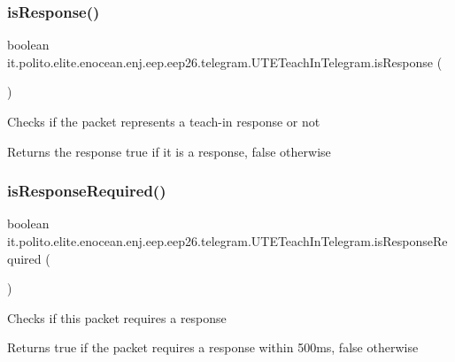 \subsubsection{\texorpdfstring{is\+Response()}{isResponse()}}
{\footnotesize\ttfamily boolean it.\+polito.\+elite.\+enocean.\+enj.\+eep.\+eep26.\+telegram.\+U\+T\+E\+Teach\+In\+Telegram.\+is\+Response (\begin{DoxyParamCaption}{ }\end{DoxyParamCaption})}

Checks if the packet represents a teach-\/in response or not

\begin{DoxyReturn}{Returns}
the response true if it is a response, false otherwise 
\end{DoxyReturn}
\hypertarget{classit_1_1polito_1_1elite_1_1enocean_1_1enj_1_1eep_1_1eep26_1_1telegram_1_1_u_t_e_teach_in_telegram_a868df93eade1fb217b158f589f205971}{}\label{classit_1_1polito_1_1elite_1_1enocean_1_1enj_1_1eep_1_1eep26_1_1telegram_1_1_u_t_e_teach_in_telegram_a868df93eade1fb217b158f589f205971} 
\subsubsection{\texorpdfstring{is\+Response\+Required()}{isResponseRequired()}}
{\footnotesize\ttfamily boolean it.\+polito.\+elite.\+enocean.\+enj.\+eep.\+eep26.\+telegram.\+U\+T\+E\+Teach\+In\+Telegram.\+is\+Response\+Required (\begin{DoxyParamCaption}{ }\end{DoxyParamCaption})}

Checks if this packet requires a response

\begin{DoxyReturn}{Returns}
true if the packet requires a response within 500ms, false otherwise 
\end{DoxyReturn}
\hypertarget{classit_1_1polito_1_1elite_1_1enocean_1_1enj_1_1eep_1_1eep26_1_1telegram_1_1_u_t_e_teach_in_telegram_a8f9efe6b4457273e6c75daffccfca806}{}\label{classit_1_1polito_1_1elite_1_1enocean_1_1enj_1_1eep_1_1eep26_1_1telegram_1_1_u_t_e_teach_in_telegram_a8f9efe6b4457273e6c75daffccfca806} 
